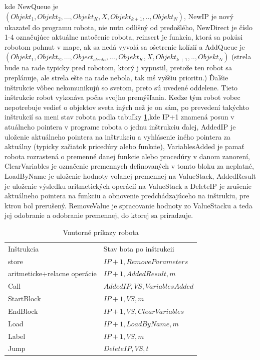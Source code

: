 \indent
kde NewQueue je \\ $(Objekt_1, Objekt_2, ..., Objekt_K, X, Objekt_{k+1},.., Objekt_N)$, NewIP je nový ukazateľ do programu robota, nie nutn odlišný od predošlého, NewDirect je číslo 1-4 označujúce aktuálne natočenie robota, reinsert je funkcia, ktorá sa pokúsi robotom pohnut v mape, ak sa nedá vyvolá sa ošetrenie kolízií a AddQueue je\\ $(Objekt_1, Objekt_2, ...,Object_{strela},..., Objekt_K, X, Objekt_{k+1},.., Objekt_N)$ (strela bude na rade typicky pred robotom, ktorý j vypustil, pretože ten robot sa preplánuje, ale strela ešte na rade nebola, tak mś vyššiu prioritu.)
Ďalšie inštrukcie vôbec nekomunikujú so svetom, preto sú uvedené oddelene. Tieto inštrukcie robot vykonáva počas svojho premýšľania. Keďze tým robot vobec nepotrebuje vedieť o objektov sveta iných než je on sám, po prevedení takýchto inštrukcií sa meni stav robota podla tabuľky \ref{VnutroBota},kde IP+1 znamená posun v atuálneho pointera v programe robota o jednu inštrukciu ďalej, AddedIP je uloženie aktuálneho pointera na inštrukciu a vyhlásenie iného pointera za aktuálny (typicky začiatok pricedúry alebo funkcie), VariablesAdded je pamať robota rozrastená o premenné danej funkcie alebo procedúry v danom zanorení, ClearVariables je označenie premennych definovaných v tomto bloku za neplatné, LoadByName je uloženie hodnoty volanej premennej na ValueStack, AddedResult je uloženie výsledku aritmetických operácií na ValueStack a DeleteIP je zrušenie aktuálneho pointera na funkciu a obnovenie predchádzajúceho na inštrukiu, pre ktrou bol prerušený. RemoveValue je spracovanie hodnoty zo ValueStacku a teda jej odobranie a odobranie premennej, do ktorej sa priradzuje.

\begin{table}[ht]
\centering
\caption{Vnutorné príkazy robota}
\begin{tabular}{|l|p{5cm}|}
\hline\hline
Inštrukcia & Stav bota po inštrukcii \\
store & $ IP+1,RemoveParameters$\\
aritmeticke+relacne operácie & $IP+1,AddedResult,m$ \\
Call &  $ AddedIP,VS,VariablesAdded$\\
StartBlock & $IP+1,VS,m$\\
EndBlock & $IP+1,VS,ClearVariables$\\
Load & $ IP+1,LoadByName,m$\\
Label & $ IP+1,VS,m$\\
Jump & $ DeleteIP,VS,t$\\
\hline
\end{tabular}
\label{VnutroBota}
\end{table}

